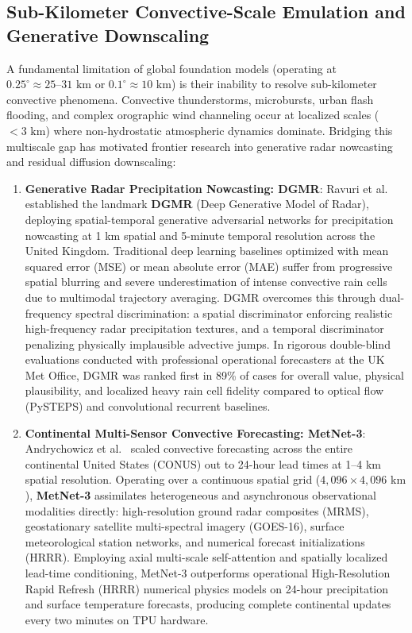 \subsection{Sub-Kilometer Convective-Scale Emulation and Generative Downscaling}
\label{sec:convective_downscaling}
A fundamental limitation of global foundation models (operating at $0.25^\circ \approx 25\text{--}31\text{ km}$ or $0.1^\circ \approx 10\text{ km}$) is their inability to resolve sub-kilometer convective phenomena. Convective thunderstorms, microbursts, urban flash flooding, and complex orographic wind channeling occur at localized scales ($< 3\text{ km}$) where non-hydrostatic atmospheric dynamics dominate. Bridging this multiscale gap has motivated frontier research into generative radar nowcasting and residual diffusion downscaling:
\begin{enumerate}
    \item \textbf{Generative Radar Precipitation Nowcasting: DGMR}: Ravuri et al.~\cite{ravuri2021dgmr} established the landmark \textbf{DGMR} (Deep Generative Model of Radar), deploying spatial-temporal generative adversarial networks for precipitation nowcasting at 1 km spatial and 5-minute temporal resolution across the United Kingdom. Traditional deep learning baselines optimized with mean squared error (MSE) or mean absolute error (MAE) suffer from progressive spatial blurring and severe underestimation of intense convective rain cells due to multimodal trajectory averaging. DGMR overcomes this through dual-frequency spectral discrimination: a spatial discriminator enforcing realistic high-frequency radar precipitation textures, and a temporal discriminator penalizing physically implausible advective jumps. In rigorous double-blind evaluations conducted with professional operational forecasters at the UK Met Office, DGMR was ranked first in 89\% of cases for overall value, physical plausibility, and localized heavy rain cell fidelity compared to optical flow (PySTEPS) and convolutional recurrent baselines.
    \item \textbf{Continental Multi-Sensor Convective Forecasting: MetNet-3}: Andrychowicz et al.~\cite{andrychowicz2023metnet3} scaled convective forecasting across the entire continental United States (CONUS) out to 24-hour lead times at 1--4 km spatial resolution. Operating over a continuous spatial grid ($4{,}096 \times 4{,}096\text{ km}$), \textbf{MetNet-3} assimilates heterogeneous and asynchronous observational modalities directly: high-resolution ground radar composites (MRMS), geostationary satellite multi-spectral imagery (GOES-16), surface meteorological station networks, and numerical forecast initializations (HRRR). Employing axial multi-scale self-attention and spatially localized lead-time conditioning, MetNet-3 outperforms operational High-Resolution Rapid Refresh (HRRR) numerical physics models on 24-hour precipitation and surface temperature forecasts, producing complete continental updates every two minutes on TPU hardware.

\end{enumerate}
